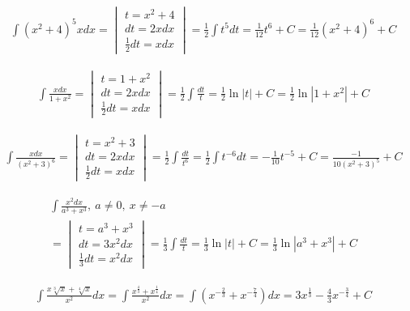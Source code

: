 \begin{gather*}
  \int (x^2+4)^5xdx =
  \begin{vmatrix}
    t=x^2+4 \\
    dt=2xdx \\
    \frac{1}{2}dt=xdx
  \end{vmatrix}
  = \frac{1}{2} \int t^5dt
  = \frac{1}{12}t^6+C
  = \frac{1}{12}(x^2+4)^6+C
\end{gather*}


\begin{gather*}
  \int \frac{xdx}{1+x^2} =
  \begin{vmatrix}
    t=1+x^2 \\
    dt=2xdx \\
    \frac{1}{2}dt=xdx
  \end{vmatrix}
  = \frac{1}{2} \int \frac{dt}{t}
  = \frac{1}{2}\ln|t|+C
  = \frac{1}{2}\ln|1+x^2|+C
\end{gather*}


\begin{gather*}
  \int \frac{xdx}{(x^2+3)^6} =
  \begin{vmatrix}
    t = x^2+3 \\
    dt = 2xdx \\
    \frac{1}{2}dt = xdx
  \end{vmatrix}
  = \frac{1}{2} \int \frac{dt}{t^6}
  = \frac{1}{2} \int t^{-6}dt
  = -\frac{1}{10}t^{-5}+C
  = \frac{-1}{10(x^2+3)^5}+C
\end{gather*}


\begin{gather*}
  \int \frac{x^2dx}{a^3+x^3}, \ a\neq 0, \ x\neq -a \\
  = \begin{vmatrix}
    t=a^3+x^3 \\
    dt=3x^2dx \\
    \frac{1}{3}dt=x^2dx
  \end{vmatrix}
  = \frac{1}{3} \int \frac{dt}{t}
  = \frac{1}{3}\ln|t|+C
  = \frac{1}{3}\ln|a^3+x^3|+C
\end{gather*}


\begin{gather*}
  \int \frac{x\sqrt[3]{x}+\sqrt[4]{x}}{x^2}dx
  = \int \frac{x^{\frac{4}{3}}+x^{\frac{1}{4}}}{x^2}dx
  = \int \left( x^{-\frac{2}{3}}+x^{-\frac{7}{4}}\right)dx
  = 3x^{\frac{1}{3}}-\frac{4}{3}x^{-\frac{3}{4}}+C
\end{gather*}

